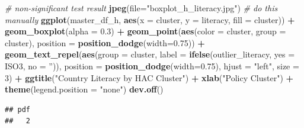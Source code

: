 \documentclass[]{article}
\newenvironment{Shaded}{\begin{snugshade}}{\end{snugshade}}
\newcommand{\CommentTok}[1]{\textcolor[rgb]{0.56,0.35,0.01}{\textit{#1}}}
\newcommand{\DataTypeTok}[1]{\textcolor[rgb]{0.13,0.29,0.53}{#1}}
\newcommand{\DecValTok}[1]{\textcolor[rgb]{0.00,0.00,0.81}{#1}}
\newcommand{\FloatTok}[1]{\textcolor[rgb]{0.00,0.00,0.81}{#1}}
\newcommand{\KeywordTok}[1]{\textcolor[rgb]{0.13,0.29,0.53}{\textbf{#1}}}
\newcommand{\NormalTok}[1]{#1}
\newcommand{\OperatorTok}[1]{\textcolor[rgb]{0.81,0.36,0.00}{\textbf{#1}}}
\newcommand{\StringTok}[1]{\textcolor[rgb]{0.31,0.60,0.02}{#1}}
\begin{document}
\begin{Shaded}
\begin{Highlighting}[]
\CommentTok{# non-significant test result}
\KeywordTok{jpeg}\NormalTok{(}\DataTypeTok{file=}\StringTok{"boxplot_h_literacy.jpg"}\NormalTok{)}
\CommentTok{# do this manually}
\KeywordTok{ggplot}\NormalTok{(master_df_h, }\KeywordTok{aes}\NormalTok{(}\DataTypeTok{x =}\NormalTok{ cluster, }\DataTypeTok{y =}\NormalTok{ literacy, }\DataTypeTok{fill =}\NormalTok{ cluster)) }\OperatorTok{+}
\StringTok{  }\KeywordTok{geom_boxplot}\NormalTok{(}\DataTypeTok{alpha =} \FloatTok{0.3}\NormalTok{) }\OperatorTok{+}
\StringTok{  }\KeywordTok{geom_point}\NormalTok{(}\KeywordTok{aes}\NormalTok{(}\DataTypeTok{color =}\NormalTok{ cluster, }\DataTypeTok{group =}\NormalTok{ cluster), }\DataTypeTok{position =} \KeywordTok{position_dodge}\NormalTok{(}\DataTypeTok{width=}\FloatTok{0.75}\NormalTok{)) }\OperatorTok{+}
\StringTok{  }\KeywordTok{geom_text_repel}\NormalTok{(}\KeywordTok{aes}\NormalTok{(}\DataTypeTok{group =}\NormalTok{ cluster, }
                \DataTypeTok{label =} \KeywordTok{ifelse}\NormalTok{(outlier_literacy, }
                  \DataTypeTok{yes =}\NormalTok{ ISO3,}
                  \DataTypeTok{no =} \StringTok{''}\NormalTok{)), }
            \DataTypeTok{position =} \KeywordTok{position_dodge}\NormalTok{(}\DataTypeTok{width=}\FloatTok{0.75}\NormalTok{),}
            \DataTypeTok{hjust =} \StringTok{"left"}\NormalTok{, }\DataTypeTok{size =} \DecValTok{3}\NormalTok{) }\OperatorTok{+}\StringTok{ }
\StringTok{  }\KeywordTok{ggtitle}\NormalTok{(}\StringTok{"Country Literacy by HAC Cluster"}\NormalTok{) }\OperatorTok{+}\StringTok{ }\KeywordTok{xlab}\NormalTok{(}\StringTok{"Policy Cluster"}\NormalTok{) }\OperatorTok{+}\StringTok{ }\KeywordTok{theme}\NormalTok{(}\DataTypeTok{legend.position =} \StringTok{"none"}\NormalTok{)}
\KeywordTok{dev.off}\NormalTok{()}
\end{Highlighting}
\end{Shaded}

\begin{verbatim}
## pdf 
##   2
\end{verbatim}
\end{document}
